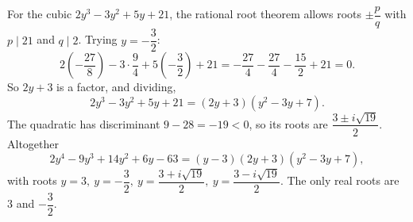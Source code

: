 For the cubic $2y^3-3y^2+5y+21$, the rational root theorem allows roots $\pm\dfrac{p}{q}$ with $p\mid21$ and $q\mid2$. Trying $y=-\dfrac{3}{2}$:
\[
2\left(-\dfrac{27}{8}\right)-3\cdot\dfrac{9}{4}+5\left(-\dfrac{3}{2}\right)+21=-\dfrac{27}{4}-\dfrac{27}{4}-\dfrac{15}{2}+21=0 .
\]
So $2y+3$ is a factor, and dividing,
\[
2y^3-3y^2+5y+21=(2y+3)(y^2-3y+7).
\]
The quadratic has discriminant $9-28=-19<0$, so its roots are $\dfrac{3\pm i\sqrt{19}}{2}$. Altogether
\[
2y^4-9y^3+14y^2+6y-63=(y-3)(2y+3)(y^2-3y+7),
\]
with roots $\boxed{y=3,\ y=-\dfrac{3}{2},\ y=\dfrac{3+i\sqrt{19}}{2},\ y=\dfrac{3-i\sqrt{19}}{2}}$. The only real roots are $3$ and $-\dfrac{3}{2}$.
